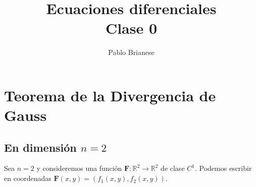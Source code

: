 \documentclass{report}
\title{Ecuaciones diferenciales \\ Clase 0}
\author{Pablo Brianese}
\newcommand{\realNumbers}{\mathbb{R}}
\theoremstyle{definition}
\theoremstyle{remark}
\begin{document}
  \maketitle

  \chapter{Teorema de la Divergencia de Gauss}

  \section{En dimensión \(n = 2\)}

  Sea \(n = 2\) y consideremos una función \(\mathbf{F} : \realNumbers^2 \rightarrow \realNumbers^2\) de clase \(C^1\).
  Podemos escribir en coordenadas \(\mathbf{F}(x, y) = (f_1(x, y), f_2(x, y))\).
  
\end{document}

